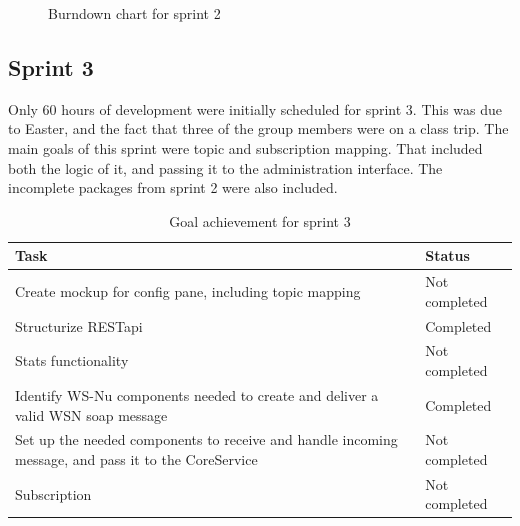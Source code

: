 \begin{center}
  \begin{figure}[ht!]
    \caption{Burndown chart for sprint 2}
    \label{fig:sprint 2, burndown}
  \end{figure}
\end{center}


\subsection{Sprint 3}
\label{subsec:project_lifecycle-development-sprint_3}

Only 60 hours of development were initially scheduled for sprint 3. This was due to Easter, and the fact that three of the group members were on a class trip. The main goals of this sprint were topic and subscription mapping. That included both the logic of it, and passing it to the administration interface. The incomplete packages from sprint 2 were also included.

\clearpage

\begin{table}[t]
\small
\centering
\begin{tabular}{ | p{10cm} | p{2cm} |}
\hline
\rowcolor{lightgray}
 \textbf{Task} & \textbf{Status} \\
\hline
\rowcolor{orange!40}
Create mockup for config pane, including topic mapping & Not completed \\
\rowcolor{green!30}
Structurize RESTapi & Completed \\
\rowcolor{orange!40}
Stats functionality & Not completed \\
\rowcolor{green!30}
Identify WS-Nu components needed to create and deliver a valid WSN soap message & Completed \\
\rowcolor{orange!40}
Set up the needed components to receive and handle incoming message, and pass it to the CoreService & Not completed \\
\rowcolor{orange!40}
Subscription & Not completed \\
\hline
\end{tabular}
\caption{Goal achievement for sprint 3}
\label{tab:sprint 3, goals}
\end{table}

